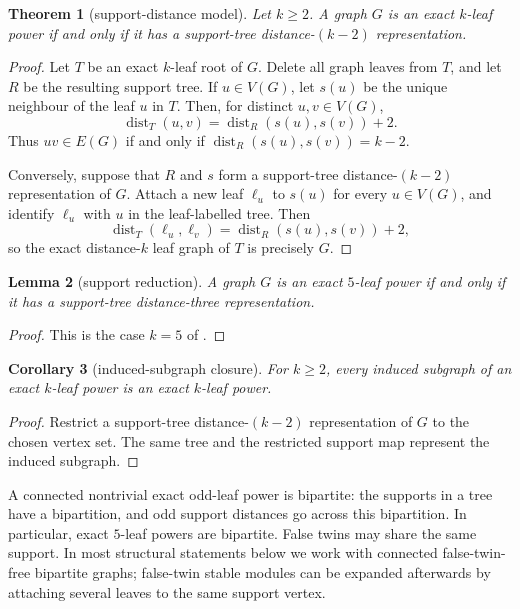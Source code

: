\documentclass[11pt]{article}
\newtheorem{theorem}{Theorem}[section]
\newtheorem{lemma}[theorem]{Lemma}
\newtheorem{corollary}[theorem]{Corollary}
\theoremstyle{definition}
\newcommand{\dist}{\operatorname{dist}}
\begin{document}
\begin{theorem}[support-distance model]\label{thm:support-model}
Let $k\ge2$.  A graph $G$ is an exact $k$-leaf power if and only if it has a support-tree distance-$(k-2)$ representation.
\end{theorem}

\begin{proof}
Let $T$ be an exact $k$-leaf root of $G$.  Delete all graph leaves from $T$, and let $R$ be the resulting support tree.  If $u\in V(G)$, let $s(u)$ be the unique neighbour of the leaf $u$ in $T$.  Then, for distinct $u,v\in V(G)$,
\[
 \dist_T(u,v)=\dist_R(s(u),s(v))+2.
\]
Thus $uv\in E(G)$ if and only if $\dist_R(s(u),s(v))=k-2$.

Conversely, suppose that $R$ and $s$ form a support-tree distance-$(k-2)$ representation of $G$.  Attach a new leaf $\ell_u$ to $s(u)$ for every $u\in V(G)$, and identify $\ell_u$ with $u$ in the leaf-labelled tree.  Then
\[
 \dist_T(\ell_u,\ell_v)=\dist_R(s(u),s(v))+2,
\]
so the exact distance-$k$ leaf graph of $T$ is precisely $G$.
\end{proof}

\begin{lemma}[support reduction]\label{lem:support-reduction}
A graph $G$ is an exact $5$-leaf power if and only if it has a support-tree distance-three representation.
\end{lemma}

\begin{proof}
This is the case $k=5$ of .
\end{proof}

\begin{corollary}[induced-subgraph closure]\label{cor:induced-closure}
For $k\ge2$, every induced subgraph of an exact $k$-leaf power is an exact $k$-leaf power.
\end{corollary}

\begin{proof}
Restrict a support-tree distance-$(k-2)$ representation of $G$ to the chosen vertex set.  The same tree and the restricted support map represent the induced subgraph.
\end{proof}

A connected nontrivial exact odd-leaf power is bipartite: the supports in a tree have a bipartition, and odd support distances go across this bipartition.  In particular, exact $5$-leaf powers are bipartite.  False twins may share the same support.  In most structural statements below we work with connected false-twin-free bipartite graphs; false-twin stable modules can be expanded afterwards by attaching several leaves to the same support vertex.
\end{document}
